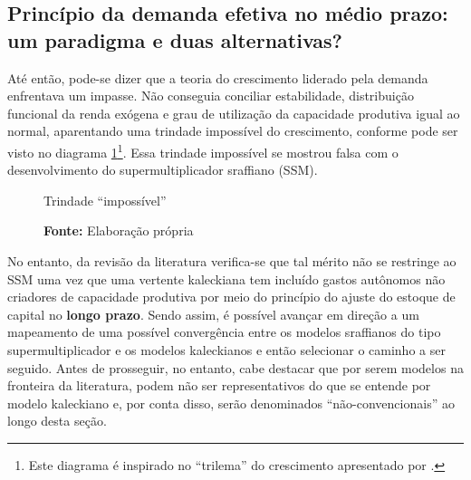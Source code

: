 \subsection{Princípio da demanda efetiva no médio prazo: um paradigma e duas alternativas?}
\label{Medium}

Até então, pode-se dizer que a teoria do crescimento liderado pela demanda enfrentava um impasse. Não conseguia conciliar estabilidade, distribuição funcional da renda exógena e grau de utilização da capacidade produtiva igual ao normal, aparentando uma trindade impossível do crescimento, conforme pode ser visto no diagrama \ref{diagrama}\footnote{Este diagrama é inspirado no ``trilema'' do crescimento apresentado por \textcite{cesaratto_neo-kaleckian_2015}.}.
Essa trindade impossível se mostrou falsa com o desenvolvimento do supermultiplicador sraffiano (SSM).

\begin{figure}[H]
	\caption{Trindade ``impossível''}
	\label{diagrama}
	\begin{center}
	\end{center}
	\caption*{\textbf{Fonte:} Elaboração própria}
\end{figure}
No entanto, da revisão da literatura verifica-se que tal mérito não se restringe ao SSM uma vez que uma vertente kaleckiana tem incluído gastos autônomos não criadores de capacidade produtiva por meio do princípio do ajuste do estoque de capital no \textbf{longo prazo}.
Sendo assim, é possível avançar em direção a um mapeamento de uma possível convergência entre os modelos sraffianos do tipo supermultiplicador e os modelos kaleckianos e então selecionar o caminho a ser seguido.
Antes de prosseguir, no entanto, cabe destacar que por serem modelos na fronteira da literatura, podem não ser representativos do que se entende por modelo kaleckiano e, por conta disso, serão denominados ``não-convencionais'' ao longo desta seção.

